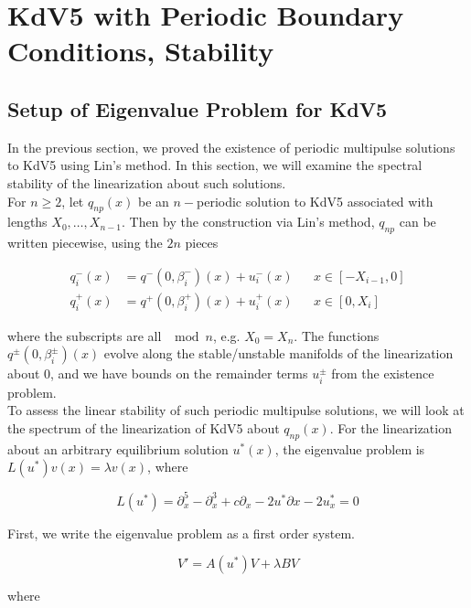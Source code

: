 \documentclass[12pt]{article}
\begin{document}
\section{KdV5 with Periodic Boundary Conditions, Stability}

\subsection{Setup of Eigenvalue Problem for KdV5}

In the previous section, we proved the existence of periodic multipulse solutions to KdV5 using Lin's method. In this section, we will examine the spectral stability of the linearization about such solutions.\\

For $n \geq 2$, let $q_{np}(x)$ be an $n-$periodic solution to KdV5 associated with lengths $X_0, \dots, X_{n-1}$. Then by the construction via Lin's method, $q_{np}$ can be written piecewise, using the $2n$ pieces

\begin{align*}
q_i^-(x) &= q^-(0, \beta_i^-)(x) + u_i^-(x) && x \in [-X_{i-1}, 0]\\
q_i^+(x) &= q^+(0, \beta_i^+)(x) + u_i^+(x) && x \in [0, X_i]
\end{align*}

where the subscripts are all $\mod n$, e.g. $X_0 = X_n$. The functions $q^\pm(0, \beta_i^\pm)(x)$ evolve along the stable/unstable manifolds of the linearization about 0, and we have bounds on the remainder terms $u_i^\pm$ from the existence problem.\\

To assess the linear stability of such periodic multipulse solutions, we will look at the spectrum of the linearization of KdV5 about $q_{np}(x)$. For the linearization about an arbitrary equilibrium solution $u^*(x)$, the eigenvalue problem is $L(u^*) v(x) = \lambda v(x)$, where

\begin{equation}
L(u^*) = \partial_x^5 - \partial_x^3 + c \partial_x - 2 u^* \partial x - 2 u^*_x = 0
\end{equation}

First, we write the eigenvalue problem as a first order system.

\begin{equation}
V' = A(u^*)V + \lambda B V
\end{equation}

where
\end{document}
